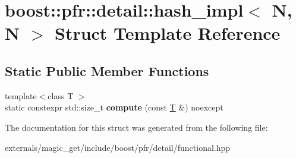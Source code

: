 \hypertarget{structboost_1_1pfr_1_1detail_1_1hash__impl_3_01_n_00_01_n_01_4}{}\section{boost\+:\+:pfr\+:\+:detail\+:\+:hash\+\_\+impl$<$ N, N $>$ Struct Template Reference}
\label{structboost_1_1pfr_1_1detail_1_1hash__impl_3_01_n_00_01_n_01_4}
\subsection*{Static Public Member Functions}
\begin{DoxyCompactItemize}
\item 
\mbox{\label{structboost_1_1pfr_1_1detail_1_1hash__impl_3_01_n_00_01_n_01_4_afa7e39af4ecca6358c0efe4db457d238}} 
{\footnotesize template$<$class T $>$ }\\static constexpr std\+::size\+\_\+t {\bfseries compute} (const \mbox{\hyperlink{struct_t}{T}} \&) noexcept
\end{DoxyCompactItemize}


The documentation for this struct was generated from the following file\+:\begin{DoxyCompactItemize}
\item 
externals/magic\+\_\+get/include/boost/pfr/detail/functional.\+hpp\end{DoxyCompactItemize}
